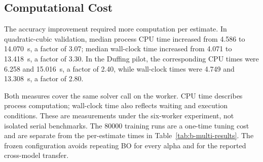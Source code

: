 \subsection{Computational Cost}
\begin{bluerevision}
The accuracy improvement required more computation per estimate. In quadratic-cubic validation, median process CPU time increased from 4.586 to 14.070~s, a factor of 3.07; median wall-clock time increased from 4.071 to 13.418~s, a factor of 3.30. In the Duffing pilot, the corresponding CPU times were 6.258 and 15.016~s, a factor of 2.40, while wall-clock times were 4.749 and 13.308~s, a factor of 2.80.

Both measures cover the same solver call on the worker. CPU time describes process computation; wall-clock time also reflects waiting and execution conditions. These are measurements under the six-worker experiment, not isolated serial benchmarks. The 80000 training runs are a one-time tuning cost and are separate from the per-estimate times in Table~\ref{tab:b-multi-results}. The frozen configuration avoids repeating BO for every alpha and for the reported cross-model transfer.
\end{bluerevision}


\FloatBarrier
